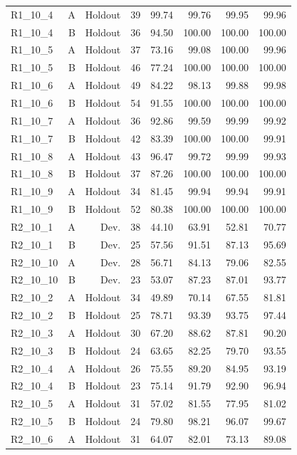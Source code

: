 \begin{longtable}{@{}lrrrrrrr@{}}
R1\_10\_4 & A & Holdout & 39 & 99.74 & 99.76 & 99.95 & 99.96 \\
R1\_10\_4 & B & Holdout & 36 & 94.50 & 100.00 & 100.00 & 100.00 \\
R1\_10\_5 & A & Holdout & 37 & 73.16 & 99.08 & 100.00 & 99.96 \\
R1\_10\_5 & B & Holdout & 46 & 77.24 & 100.00 & 100.00 & 100.00 \\
R1\_10\_6 & A & Holdout & 49 & 84.22 & 98.13 & 99.88 & 99.98 \\
R1\_10\_6 & B & Holdout & 54 & 91.55 & 100.00 & 100.00 & 100.00 \\
R1\_10\_7 & A & Holdout & 36 & 92.86 & 99.59 & 99.99 & 99.92 \\
R1\_10\_7 & B & Holdout & 42 & 83.39 & 100.00 & 100.00 & 99.91 \\
R1\_10\_8 & A & Holdout & 43 & 96.47 & 99.72 & 99.99 & 99.93 \\
R1\_10\_8 & B & Holdout & 37 & 87.26 & 100.00 & 100.00 & 100.00 \\
R1\_10\_9 & A & Holdout & 34 & 81.45 & 99.94 & 99.94 & 99.91 \\
R1\_10\_9 & B & Holdout & 52 & 80.38 & 100.00 & 100.00 & 100.00 \\
R2\_10\_1 & A & Dev. & 38 & 44.10 & 63.91 & 52.81 & 70.77 \\
R2\_10\_1 & B & Dev. & 25 & 57.56 & 91.51 & 87.13 & 95.69 \\
R2\_10\_10 & A & Dev. & 28 & 56.71 & 84.13 & 79.06 & 82.55 \\
R2\_10\_10 & B & Dev. & 23 & 53.07 & 87.23 & 87.01 & 93.77 \\
R2\_10\_2 & A & Holdout & 34 & 49.89 & 70.14 & 67.55 & 81.81 \\
R2\_10\_2 & B & Holdout & 25 & 78.71 & 93.39 & 93.75 & 97.44 \\
R2\_10\_3 & A & Holdout & 30 & 67.20 & 88.62 & 87.81 & 90.20 \\
R2\_10\_3 & B & Holdout & 24 & 63.65 & 82.25 & 79.70 & 93.55 \\
R2\_10\_4 & A & Holdout & 26 & 75.55 & 89.20 & 84.95 & 93.19 \\
R2\_10\_4 & B & Holdout & 23 & 75.14 & 91.79 & 92.90 & 96.94 \\
R2\_10\_5 & A & Holdout & 31 & 57.02 & 81.55 & 77.95 & 81.02 \\
R2\_10\_5 & B & Holdout & 24 & 79.80 & 98.21 & 96.07 & 99.67 \\
R2\_10\_6 & A & Holdout & 31 & 64.07 & 82.01 & 73.13 & 89.08 \\

\end{longtable}
